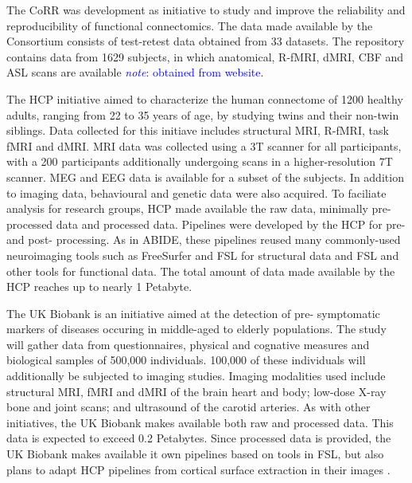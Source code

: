 \documentclass{report}
\newcommand{\note}[1]{\textcolor{blue}{\textit{note}: #1}}
\begin{document}
            The CoRR was development as initiative to study and improve the 
            reliability and reproducibility of functional connectomics. The 
            data made available by the Consortium consists of test-retest data 
            obtained from 33 datasets. The repository contains data from 1629 
            subjects, in which anatomical, R-fMRI, dMRI, CBF and ASL scans are 
            available \note{obtained from website}.


            The HCP initiative aimed to characterize the human connectome of 
            1200 healthy adults, ranging from 22 to 35 years of age, by studying
            twins and their non-twin siblings. Data collected for this initiave
            includes structural MRI, R-fMRI, task fMRI and dMRI. MRI data was
            collected using a 3T scanner for all participants, with a 200 
            participants additionally undergoing scans in a higher-resolution 7T
            scanner. MEG and EEG data is available for a subset of the subjects. 
            In addition to imaging data, behavioural and genetic data were also 
            acquired. To faciliate analysis for research groups, HCP made 
            available the raw data, minimally pre-processed data and processed 
            data. Pipelines were developed by the HCP for pre- and post-
            processing. As in ABIDE, these pipelines reused many commonly-used
            neuroimaging tools such as FreeSurfer and FSL for structural data
            and FSL and other tools for functional data. The total amount of
            data made available by the HCP reaches up to nearly 1 Petabyte.


            The UK Biobank is an initiative aimed at the detection of pre-
            symptomatic markers of diseases occuring in middle-aged to elderly 
            populations. The study will gather data from questionnaires, 
            physical and cognative measures and biological samples of 500,000
            individuals. 100,000 of these individuals will additionally be 
            subjected to imaging studies. Imaging modalities used include
            structural MRI, fMRI and dMRI of the brain heart and body; low-dose
            X-ray bone and joint scans; and ultrasound of the carotid arteries.
            As with other initiatives, the UK Biobank makes available both 
            raw and processed data. This data is expected to exceed 0.2 
            Petabytes. Since processed data is provided, the UK Biobank makes 
            available it own pipelines based on tools in FSL, but also plans to
            adapt HCP pipelines from cortical surface extraction in their images
            .
\end{document}
